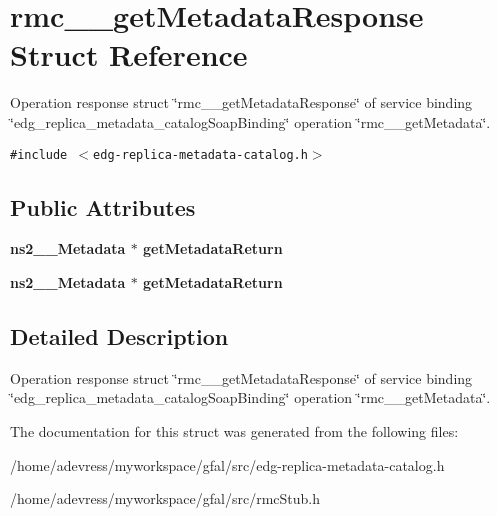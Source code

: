 \section{rmc\_\-\_\-get\-Metadata\-Response Struct Reference}
\label{structrmc____getMetadataResponse}
Operation response struct \char`\"{}rmc\_\-\_\-get\-Metadata\-Response\char`\"{} of service binding \char`\"{}edg\_\-replica\_\-metadata\_\-catalog\-Soap\-Binding\char`\"{} operation \char`\"{}rmc\_\-\_\-get\-Metadata\char`\"{}.  


{\tt \#include $<$edg-replica-metadata-catalog.h$>$}

\subsection*{Public Attributes}
\begin{CompactItemize}
\item 
\bf{ns2\_\-\_\-Metadata} $\ast$ \textbf{get\-Metadata\-Return}\label{structrmc____getMetadataResponse_c18eb8ddf1b49cd7ba8fb9b0a92cb781}

\item 
\bf{ns2\_\-\_\-Metadata} $\ast$ \textbf{get\-Metadata\-Return}\label{structrmc____getMetadataResponse_c18eb8ddf1b49cd7ba8fb9b0a92cb781}

\end{CompactItemize}


\subsection{Detailed Description}
Operation response struct \char`\"{}rmc\_\-\_\-get\-Metadata\-Response\char`\"{} of service binding \char`\"{}edg\_\-replica\_\-metadata\_\-catalog\-Soap\-Binding\char`\"{} operation \char`\"{}rmc\_\-\_\-get\-Metadata\char`\"{}. 



The documentation for this struct was generated from the following files:\begin{CompactItemize}
\item 
/home/adevress/myworkspace/gfal/src/edg-replica-metadata-catalog.h\item 
/home/adevress/myworkspace/gfal/src/rmc\-Stub.h\end{CompactItemize}
